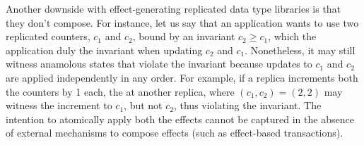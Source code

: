 Another downside with effect-generating replicated data type libraries
is that they don't compose. For instance, let us say that an
application wants to use two replicated counters, $c_1$ and $c_2$,
bound by an invariant $c_2 \ge c_1$, which the application duly the
invariant when updating $c_2$ and $c_1$. Nonetheless, it may still
witness anamolous states that violate the invariant because updates to
$c_1$ and $c_2$ are applied independently in any order. For example,
if a replica increments both the counters by 1 each, the  at
another replica, where $(c_1,c_2) = (2,2)$ may witness the increment
to $c_1$, but not $c_2$, thus violating the invariant. The intention
to atomically apply both the effects cannot be captured in the absence
of external mechanisms to compose effects (such as effect-based
transactions).  

